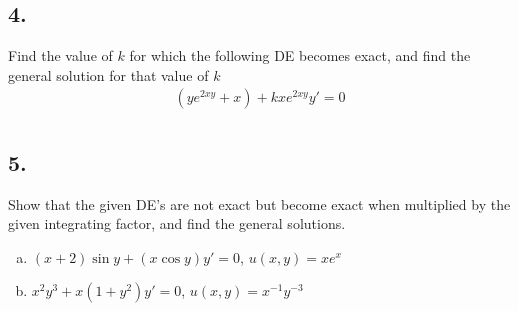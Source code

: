 \subsection*{4. }
Find the value of $ k $ for which the following DE becomes exact, and find the general solution for that value of $ k $
\begin{align*}
	(y e ^ {2xy} + x) + k x e ^ {2xy} y ' = 0 \\
\end{align*}




\subsection*{5. }
Show that the given DE's are not exact but become exact when multiplied by the given integrating factor, and find the general solutions.
\begin{enumerate}[a)]
	\item $ (x+2) \sin y + (x \cos y)y' = 0 $, $u(x,y) = x e ^ x $
	\item $ x ^ 2 y ^ 3 + x (1 + y ^ 2) y ' = 0 $, $ u(x,y) = x ^ {-1} y ^ {-3} $
\end{enumerate}






